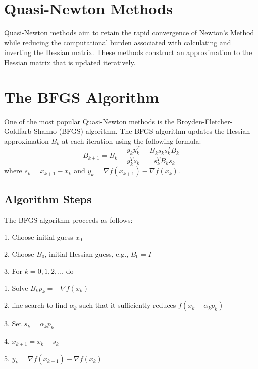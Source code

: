 \documentclass{article}
\begin{document}
\section{Quasi-Newton Methods}

Quasi-Newton methods aim to retain the rapid convergence of Newton's Method while reducing the computational burden associated with calculating and inverting the Hessian matrix. These methods construct an approximation to the Hessian matrix that is updated iteratively.

\section{The BFGS Algorithm}

One of the most popular Quasi-Newton methods is the Broyden-Fletcher-Goldfarb-Shanno (BFGS) algorithm. The BFGS algorithm updates the Hessian approximation \( B_k \) at each iteration using the following formula:
\begin{equation}
B_{k+1} = B_k + \frac{y_k y_k^T}{y_k^T s_k} - \frac{B_k s_k s_k^T B_k}{s_k^T B_k s_k}
\end{equation}
where \( s_k = x_{k+1} - x_k \) and \( y_k = \nabla f(x_{k+1}) - \nabla f(x_k) \).

\subsection{Algorithm Steps}

The BFGS algorithm proceeds as follows:

1. Choose initial guess \( x_0 \)

2. Choose \( B_0 \), initial Hessian guess, e.g., \( B_0 = I \)

3. For \( k = 0, 1, 2, \ldots \) do

\hspace{0.5cm} 1. Solve \( B_k p_k = -\nabla f (x_k) \)

\hspace{0.5cm} 2. line search to find \( \alpha_k \) such that it sufficiently reduces \( f(x_k + \alpha_k p_k) \)

\hspace{0.5cm} 3. Set \( s_k = \alpha_k p_k \)

\hspace{0.5cm} 4. \( x_{k+1} = x_k + s_k \)

\hspace{0.5cm} 5. \( y_k = \nabla f(x_{k+1}) - \nabla f(x_k) \)
\end{document}
